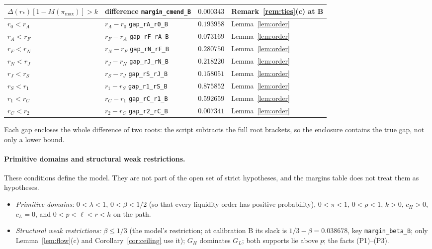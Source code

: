 \documentclass[11pt]{article}
\theoremstyle{definition}
\begin{document}
\begin{table}[h]
\begin{tabular}{@{}llll@{}}
$\Delta(r_*)[1-M(\pi_{\max})]>k$ & difference \hfill\texttt{margin\_cmend\_B} & $0.000343$ & Remark~\ref{rem:ties}(c) at B\\
\midrule
$r_0<r_A$ & $r_A-r_0$ \hfill\texttt{gap\_rA\_r0\_B} & $0.193958$ & Lemma~\ref{lem:order}\\
$r_A<r_F$ & $r_F-r_A$ \hfill\texttt{gap\_rF\_rA\_B} & $0.073169$ & Lemma~\ref{lem:order}\\
$r_F<r_N$ & $r_N-r_F$ \hfill\texttt{gap\_rN\_rF\_B} & $0.280750$ & Lemma~\ref{lem:order}\\
$r_N<r_J$ & $r_J-r_N$ \hfill\texttt{gap\_rJ\_rN\_B} & $0.218220$ & Lemma~\ref{lem:order}\\
$r_J<r_S$ & $r_S-r_J$ \hfill\texttt{gap\_rS\_rJ\_B} & $0.158051$ & Lemma~\ref{lem:order}\\
$r_S<r_1$ & $r_1-r_S$ \hfill\texttt{gap\_r1\_rS\_B} & $0.875852$ & Lemma~\ref{lem:order}\\
$r_1<r_C$ & $r_C-r_1$ \hfill\texttt{gap\_rC\_r1\_B} & $0.592659$ & Lemma~\ref{lem:order}\\
$r_C<r_2$ & $r_2-r_C$ \hfill\texttt{gap\_r2\_rC\_B} & $0.007341$ & Lemma~\ref{lem:order}\\
\bottomrule
\end{tabular}
\end{table}

Each gap encloses the whole difference of two roots: the script subtracts the full root brackets, so the
enclosure contains the true gap, not only a lower bound.

\paragraph{Primitive domains and structural weak restrictions.} These conditions define the model. They are not
part of the open set of strict hypotheses, and the margins table does not treat them as hypotheses.
\begin{itemize}
\item \emph{Primitive domains:} $0<\lambda<1$, $0<\beta<1/2$ (so that every liquidity order has positive
  probability), $0<\pi<1$, $0<\rho<1$, $k>0$, $c_H>0$, $c_L=0$, and $0<p<\ell<r<h$ on the path.
\item \emph{Structural weak restrictions:} $\beta\le1/3$ (the model's restriction; at calibration B its slack is
  $1/3-\beta=0.038678$, key \texttt{margin\_beta\_B}; only Lemma~\ref{lem:flow}(c) and Corollary~\ref{cor:ceiling}
  use it); $G_H$ dominates $G_L$; both supports lie above $p$; the facts (P1)--(P3).
\end{itemize}
\end{document}
